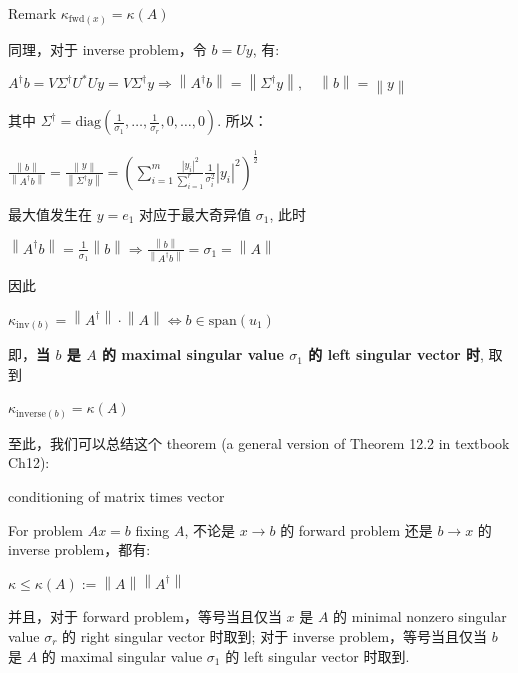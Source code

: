 \begin{qlremark}{Remark}
\(\kappa_{\text{fwd}{(x)}} = \kappa(A)\)

同理，对于 inverse problem，令 \(b = Uy\), 有:

\(A^{\dagger}b = V\Sigma^{\dagger}U^{\ast}Uy = V\Sigma^{\dagger}y\Rightarrow\left\| {A^{\dagger}b} \right\| = \left\| {\Sigma^{\dagger}y} \right\|,\quad\left\| b \right\| = \left\| y \right\|\)

其中 \(\Sigma^{\dagger} = \text{diag}\left( {\frac{1}{\sigma_{1}},\ldots,\frac{1}{\sigma_{r}},0,\ldots,0} \right)\). 所以：

\(\frac{\left\| b \right\|}{\left\| {A^{\dagger}b} \right\|} = \frac{\left\| y \right\|}{\left\| {\Sigma^{\dagger}y} \right\|} = \left( {\sum_{i = 1}^{m}\frac{\left| y_{i} \right|^{2}}{\sum_{i = 1}^{r}}\frac{1}{\sigma_{i}^{2}}\left| y_{i} \right|^{2}} \right)^{\frac{1}{2}}\)

最大值发生在 \(y = e_{1}\) 对应于最大奇异值 \(\sigma_{1}\), 此时

\(\left\| {A^{\dagger}b} \right\| = \frac{1}{\sigma_{1}}\left\| b \right\|\Rightarrow\frac{\left\| b \right\|}{\left\| {A^{\dagger}b} \right\|} = \sigma_{1} = \left\| A \right\|\)

因此

\(\kappa_{\text{inv}{(b)}} = \left\| A^{\dagger} \right\| \cdot \left\| A \right\|\Leftrightarrow b \in \text{span}\left( u_{1} \right)\)

即，\textbf{当 \(b\) 是 \(A\) 的 maximal singular value \(\sigma_{1}\) 的 left singular vector 时}, 取到

\(\kappa_{\text{inverse}{(b)}} = \kappa(A)\)

\end{qlremark}

至此，我们可以总结这个 theorem (a general version of Theorem 12.2 in textbook Ch12):

\begin{theorem}{conditioning of matrix times vector}

For problem \(Ax = b\) fixing \(A\), 不论是 \(x\rightarrow b\) 的 forward problem 还是 \(b\rightarrow x\) 的 inverse problem，都有:

\(\kappa \leq \kappa(A) := \left\| A \right\|\left\| A^{\dagger} \right\|\)

并且，对于 forward problem，等号当且仅当 \(x\) 是 \(A\) 的 minimal nonzero singular value \(\sigma_{r}\) 的 right singular vector 时取到; 对于 inverse problem，等号当且仅当 \(b\) 是 \(A\) 的 maximal singular value \(\sigma_{1}\) 的 left singular vector 时取到.

\end{theorem}

